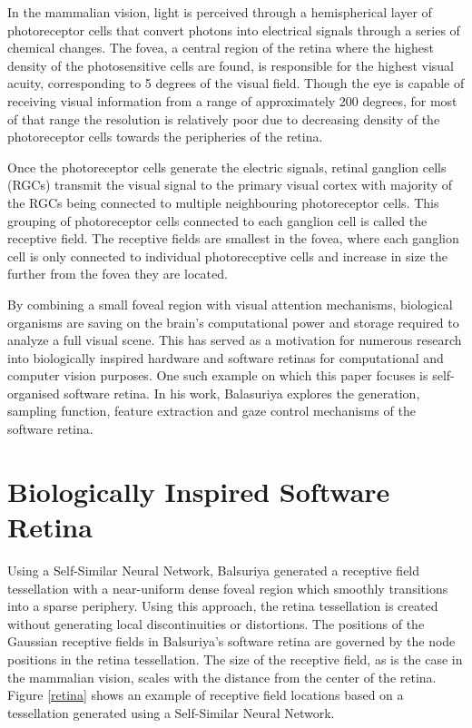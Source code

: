 \documentclass{l4proj}
\begin{document}
In the mammalian vision, light is perceived through a hemispherical layer of photoreceptor cells that convert photons into electrical signals through a series of chemical changes. The fovea, a central region of the retina where the highest density of the photosensitive cells are found, is responsible for the highest visual acuity, corresponding to 5 degrees of the visual field. Though the eye is capable of receiving visual information from a range of approximately 200 degrees, for most of that range the resolution is relatively poor due to decreasing density of the photoreceptor cells towards the peripheries of the retina. 

Once the photoreceptor cells generate the electric signals, retinal ganglion cells (RGCs) transmit the visual signal to the primary visual cortex with majority of the RGCs being connected to multiple neighbouring photoreceptor cells. This grouping of photoreceptor cells connected to each ganglion cell is called the receptive field. The receptive fields are smallest in the fovea, where each ganglion cell is only connected to individual photoreceptive cells and increase in size the further from the fovea they are located. 

By combining a small foveal region with visual attention mechanisms, biological organisms are saving on the brain's computational power and storage required to analyze a full visual scene. This has served as a motivation for numerous research into biologically inspired hardware and software retinas for computational and computer vision purposes. One such example on which this paper focuses is \citet{SumithaBalasuriya} self-organised software retina. In his work, Balasuriya explores the generation, sampling function, feature extraction and gaze control mechanisms of the software retina. 


\section{Biologically Inspired Software Retina}


Using a Self-Similar Neural Network, Balsuriya generated a receptive field tessellation with a near-uniform dense foveal region which smoothly transitions into a sparse periphery. Using this approach, the retina tessellation is created without generating local discontinuities or distortions. The positions of the Gaussian receptive fields in Balsuriya's software retina are governed by the node positions in the retina tessellation. The size of the receptive field, as is the case in the mammalian vision, scales with the distance from the center of the retina. Figure \ref{retina} shows an example of receptive field locations based on a tessellation generated using a Self-Similar Neural Network. 
\end{document}
